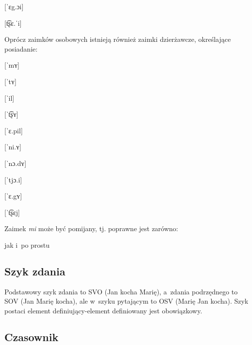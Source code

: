 \begin{spacing}{1.1}
\begin{multicols}{2}
[ˈɛg.ɔi]

[t͡ʂɛ.ˈi]

\end{multicols}

Oprócz zaimków osobowych istnieją również zaimki dzierżawcze, określające 
posiadanie:

\begin{multicols}{2}

[ˈmʏ]

[ˈtʏ]


[ˈil]

[ˈt͡ʂʏ]

[ˈɛ.pil]

[ˈni.ʏ]

[ˈnɔ.dʏ]

[ˈtjɔ.i]

[ˈɛ.gʏ]

[ˈt͡ʂɛj]

\end{multicols}

\noindent
Zaimek \emph{mi} może być pomijany, tj. poprawne jest zarówno: 


\noindent
jak i~po prostu


\subsection{Szyk zdania}

Podstawowy szyk zdania to SVO (Jan kocha Marię), a~zdania podrzędnego to SOV 
(Jan Marię kocha), ale w~szyku pytającym to OSV (Marię Jan kocha). Szyk postaci 
element definiujący-element definiowany jest obowiązkowy.

\subsection{Czasownik}


\end{spacing}
